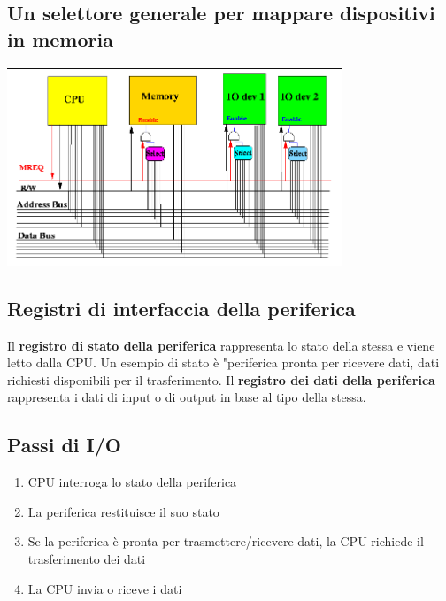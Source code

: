 \documentclass[12pt, a4paper, openany]{book}
\begin{document}
\subsection*{Un selettore generale per mappare dispositivi in memoria}
\begin{center}
    \includegraphics[width=100mm, scale=0.5]{selettore per mappare periferiche.png}
\end{center}
\subsection*{Registri di interfaccia della periferica}
Il \textbf{registro di stato della periferica} rappresenta lo stato della stessa e viene letto dalla CPU. Un esempio di stato è 
"periferica pronta per ricevere dati, dati richiesti disponibili per il trasferimento.
Il \textbf{registro dei dati della periferica} rappresenta i dati di input o di output in base al tipo della stessa.
\subsection{Passi di I/O}
\begin{enumerate}
    \item CPU interroga lo stato della periferica
    \item La periferica restituisce il suo stato
    \item Se la periferica è pronta per trasmettere/ricevere dati, la CPU richiede il trasferimento dei dati
    \item La CPU invia o riceve i dati
\end{enumerate}
\end{document}
